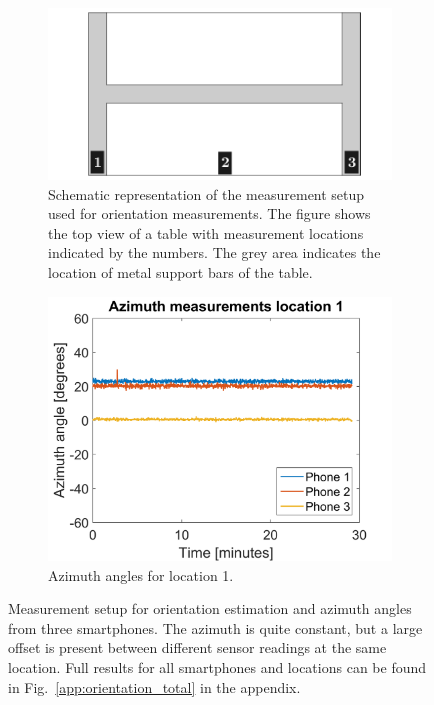 \documentclass[a4paper, notitlepage]{report}
\begin{document}
\begin{figure}[htb]
\centering
\end{figure}

\begin{figure}[H]
\begin{adjustwidth}{-1in}{-1in}
\centering
	\begin{subfigure}{0.5\textwidth}
		\includegraphics[width=\textwidth]{figures/orientation/measurement_setup}
		\caption[Measurement setup used for orientation measurements.]{Schematic representation of the measurement setup used for orientation measurements. The figure shows the top view of a table with measurement locations indicated by the numbers. The grey area indicates the location of metal support bars of the table.}
		\label{fig:orientation_measurement_setup}
	\end{subfigure}
	\begin{subfigure}{0.5\textwidth}
		\includegraphics[width=\textwidth]{figures/orientation/az_loc1}
		\caption{Azimuth angles for location 1.}
		\label{fig:orientation_az_loc1}
	\end{subfigure}
\end{adjustwidth}
\caption[Measurement of smartphone orientations.]{Measurement setup for orientation estimation and azimuth angles from three smartphones. The azimuth is quite constant, but a large offset is present between different sensor readings at the same location. Full results for all smartphones and locations can be found in Fig.~\ref{app:orientation_total} in the appendix.}
\label{fig:orientation}
\end{figure}
\end{document}
